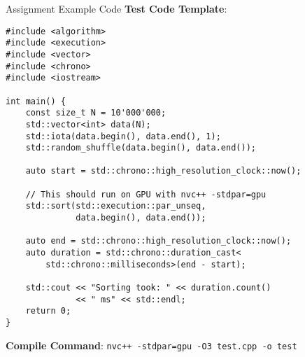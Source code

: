\begin{frame}[fragile]{Assignment Example Code}
    \textbf{Test Code Template}:

    \begin{verbatim}
#include <algorithm>
#include <execution>
#include <vector>
#include <chrono>
#include <iostream>

int main() {
    const size_t N = 10'000'000;
    std::vector<int> data(N);
    std::iota(data.begin(), data.end(), 1);
    std::random_shuffle(data.begin(), data.end());

    auto start = std::chrono::high_resolution_clock::now();

    // This should run on GPU with nvc++ -stdpar=gpu
    std::sort(std::execution::par_unseq,
              data.begin(), data.end());

    auto end = std::chrono::high_resolution_clock::now();
    auto duration = std::chrono::duration_cast<
        std::chrono::milliseconds>(end - start);

    std::cout << "Sorting took: " << duration.count()
              << " ms" << std::endl;
    return 0;
}
    \end{verbatim}

    \textbf{Compile Command}: \texttt{nvc++ -stdpar=gpu -O3 test.cpp -o test}
\end{frame}
